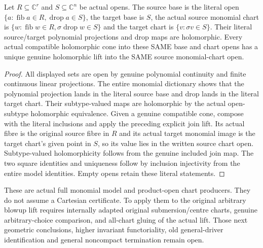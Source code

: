 \begin{theorem}
\label{hir:submersion-monomial-chart-open-cartesian}
\leanok
{}
Let $R\subseteq\mathbb C^r$ and $S\subseteq\mathbb C^n$ be actual opens. The source base is the literal open $\{a:\operatorname{fib}a\in R,\operatorname{drop}a\in S\}$, the target base is $S$, the actual source monomial chart is $\{w:\operatorname{fib}w\in R,\sigma\operatorname{drop}w\in S\}$ and the target chart is $\{v:\sigma v\in S\}$. Their literal source/target polynomial projections and drop maps are holomorphic. Every actual compatible holomorphic cone into these SAME base and chart opens has a unique genuine holomorphic lift into the SAME source monomial-chart open.
\end{theorem}
\begin{proof}
All displayed sets are open by genuine polynomial continuity and finite continuous linear projections. The entire monomial dictionary shows that the polynomial projection lands in the literal source base and drop lands in the literal target chart. Their subtype-valued maps are holomorphic by the actual open-subtype holomorphic equivalence. Given a genuine compatible cone, compose with the literal inclusions and apply the preceding explicit join lift. Its actual fibre is the original source fibre in $R$ and its actual target monomial image is the target chart's given point in $S$, so its value lies in the written source chart open. Subtype-valued holomorphicity follows from the genuine included join map. The two square identities and uniqueness follow by inclusion injectivity from the entire model identities. Empty opens retain these literal statements.
\end{proof}

These are actual full monomial model and product-open chart producers. They do not assume a Cartesian certificate. To apply them to the original arbitrary blowup lift requires internally adapted original submersion/centre charts, genuine arbitrary-choice comparison, and all-chart gluing of the actual lift. Those next geometric conclusions, higher invariant functoriality, old general-driver identification and general noncompact termination remain open.

